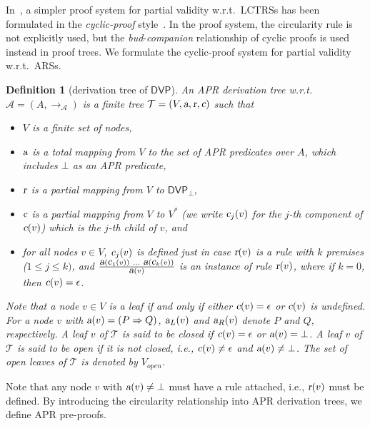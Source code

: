 \documentclass[10pt,a4paper]{article}
\newtheorem{definition}[theorem]{Definition}
\def\cA{\mathcal{A}}
\def\cT{\mathcal{T}}
\newcommand{\ReachPred}[2]{#1 \Rightarrow #2}
\newcommand{\CDVP}[1][]{\mathsf{DVP}}
\newcommand{\CDVPnew}[1][]{\mathsf{DVP}_\bot}
\newcommand{\varsl}[1]{\mbox{\sl #1}}
\def\Vopen{V_{\mathit{open}}}
\begin{document}
In~\cite{KN24jip}, a simpler proof system for partial validity w.r.t.\ LCTRSs has been formulated in the \emph{cyclic-proof} style~\cite{Bro05}.
In the proof system, the circularity rule is not explicitly used, but the \emph{bud}-\emph{companion} relationship of cyclic proofs is used instead in proof trees.
We formulate the cyclic-proof system for partial validity w.r.t.\ ARSs.
\begin{definition}[derivation tree of {$\CDVP$}]
	\label{def:APR-derivation-tree}
	An \emph{APR derivation tree} w.r.t.\ $\cA=(A,\to_\cA)$ is a finite tree $\cT=(V,\varsl{a},\varsl{r},\varsl{c})$ such that
	\begin{itemize}
		\item $V$ is a finite set of nodes,
		\item $\varsl{a}$ is a total mapping from $V$ to the set of APR predicates over $A$, which includes $\bot$ as an APR predicate, \item $\varsl{r}$ is a partial mapping from $V$ to $\CDVPnew$,
		\item $\varsl{c}$ is a partial mapping from $V$ to $V^*$ (we write $\varsl{c}_j(v)$ for the $j$-th component of $\varsl{c}(v)$) which is the $j$-th child of $v$,
		      and
		\item for all nodes $v \in V$, $\varsl{c}_j(v)$ is defined just in case $\varsl{r}(v)$ is a rule with $k$ premises ($1 \leq j \leq k)$, and $\frac{\varsl{a}(\varsl{c}_1(v)) ~ \ldots ~ \varsl{a}(\varsl{c}_k(v))}{\varsl{a}(v)}$ is an instance of rule $\varsl{r}(v)$,
		      where if $k=0$, then $\varsl{c}(v)=\epsilon$.
	\end{itemize}
	Note that a node $v \in V$ is a leaf if and only if either $\varsl{c}(v)=\epsilon$ or $\varsl{c}(v)$ is undefined.
	For a node $v$ with $\varsl{a}(v) = (\ReachPred{P}{Q})$, $\varsl{a}_L(v)$ and $\varsl{a}_R(v)$ denote $P$ and $Q$, respectively.
	A leaf $v$ of $\cT$ is said to be \emph{closed} if $\varsl{c}(v)=\epsilon$ or $\varsl{a}(v)=\bot$.
	A leaf $v$ of $\cT$ is said to be \emph{open} if it is not closed, i.e., $\varsl{c}(v)\ne\epsilon$ and $\varsl{a}(v)\ne\bot$.
	The set of open leaves of $\cT$ is denoted by $\Vopen$.
\end{definition}
Note that any node $v$ with $\varsl{a}(v)\ne \bot$ must have a rule attached, i.e., $\varsl{r}(v)$ must be defined.
By introducing the circularity relationship into APR derivation trees, we define APR pre-proofs.
\end{document}
